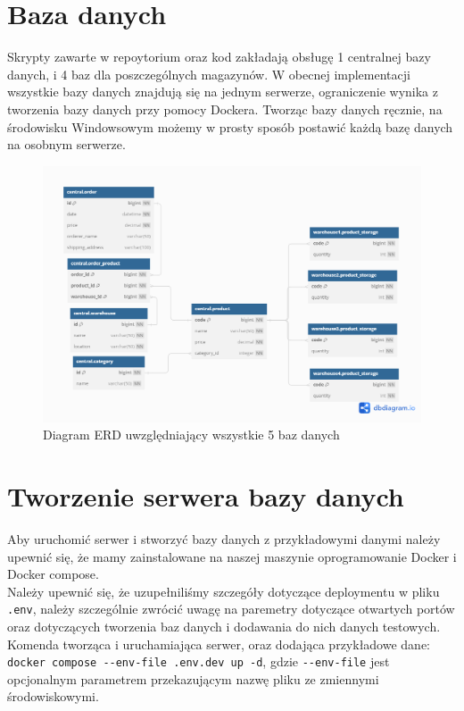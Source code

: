 \documentclass{article}
\begin{document}
\section{Baza danych}
Skrypty zawarte w repoytorium oraz kod zakładają obsługę 1 centralnej bazy danych, i 4 baz dla poszczególnych magazynów. W obecnej implementacji wszystkie bazy danych znajdują się na jednym serwerze, ograniczenie wynika z tworzenia bazy danych przy pomocy Dockera. Tworząc bazy danych ręcznie, na środowisku Windowsowym możemy w prosty sposób postawić każdą bazę danych na osobnym serwerze.
\begin{figure}[h!]
    \centering
    \includegraphics[width = \textwidth]{warehouse-distributed-system.png}
    \caption{Diagram ERD uwzględniający wszystkie 5 baz danych}
    \label{fig:enter-label}
\end{figure}
\newpage
\section{Tworzenie serwera bazy danych}
Aby uruchomić serwer i stworzyć bazy danych z przykładowymi danymi należy upewnić się, że mamy zainstalowane na naszej maszynie oprogramowanie Docker i Docker compose. \\
Należy upewnić się, że uzupełniliśmy szczegóły dotyczące deploymentu w pliku \verb|.env|, należy szczególnie zwrócić uwagę na paremetry dotyczące otwartych portów oraz dotyczących tworzenia baz danych i dodawania do nich danych testowych. \\
Komenda tworząca i uruchamiająca serwer, oraz dodająca przykładowe dane:\\ \verb|docker compose --env-file .env.dev up -d|, gdzie \verb|--env-file| jest opcjonalnym parametrem przekazującym nazwę pliku ze zmiennymi środowiskowymi.
\end{document}
